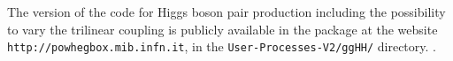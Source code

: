 The \powheg{} version of the code for Higgs boson pair production
including the possibility to vary the trilinear coupling is
publicly available in the  package at the website
{\tt http://powhegbox.mib.infn.it}, in the
{\tt User-Processes-V2/ggHH/} directory.
.
